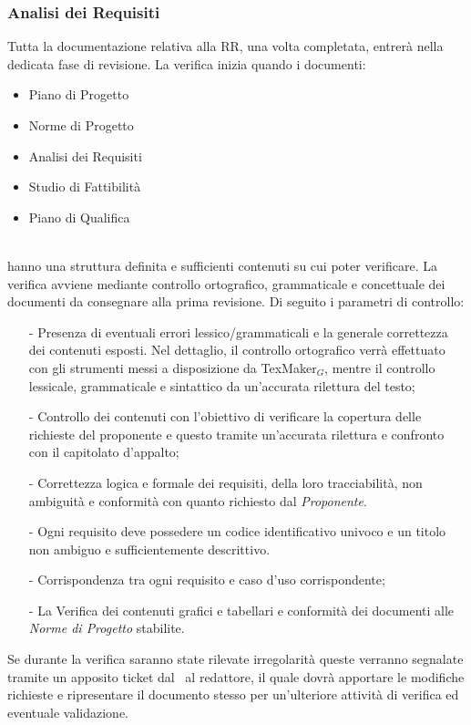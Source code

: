\subsubsection{Analisi dei Requisiti}
Tutta la documentazione relativa alla RR, una volta completata, entrerà nella dedicata fase di revisione. La verifica inizia quando i documenti:
\begin{itemize}
	\item Piano di Progetto
	\item Norme di Progetto
	\item Analisi dei Requisiti
    \item Studio di Fattibilità
	\item Piano di Qualifica
\end{itemize}\\
hanno una struttura definita e sufficienti contenuti su cui poter verificare. La verifica avviene mediante controllo ortografico, grammaticale e concettuale dei documenti da consegnare alla prima revisione. Di seguito i parametri di controllo:
\begin{itemize}
	\item[-] Presenza di eventuali errori lessico/grammaticali e la generale correttezza dei contenuti esposti. Nel dettaglio, il controllo ortografico verrà effettuato con gli strumenti messi a disposizione da TexMaker$_G$, mentre il controllo lessicale, grammaticale e sintattico da un'accurata rilettura del testo;
	\item[-] Controllo dei contenuti con l'obiettivo di verificare la copertura delle richieste del proponente e questo tramite un'accurata rilettura e confronto con il capitolato d'appalto;
	\item[-] Correttezza logica e formale dei requisiti, della loro tracciabilità, non ambiguità e conformità con quanto richiesto dal \textit{Proponente}.
	\item[-] Ogni requisito deve possedere un codice identificativo univoco e un titolo non ambiguo e sufficientemente descrittivo.
	\item[-] Corrispondenza tra ogni requisito e caso d'uso corrispondente;
	\item[-] La Verifica dei contenuti grafici e tabellari e conformità dei documenti alle \textit{Norme di Progetto} stabilite.
\end{itemize}
Se durante la verifica saranno state rilevate irregolarità
queste verranno segnalate tramite un apposito ticket dal \ruoloVerificatore\ al redattore, il quale dovrà apportare le modifiche richieste e ripresentare il documento stesso per un'ulteriore attività di verifica ed eventuale validazione.

